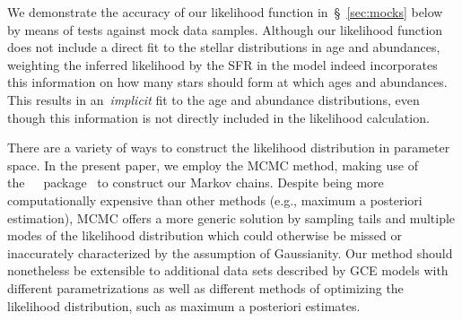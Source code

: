 \documentclass[ms.tex]{subfiles}
\begin{document}
\par
We demonstrate the accuracy of our likelihood function in~\S~\ref{sec:mocks}
below by means of tests against mock data samples.
Although our likelihood function does not include a direct fit to the
stellar distributions in age and abundances, weighting the inferred likelihood
by the SFR in the model indeed incorporates this information on how many stars
should form at which ages and abundances.
This results in an~\textit{implicit} fit to the age and abundance distributions,
even though this information is not directly included in the likelihood
calculation.
\par
There are a variety of ways to construct the likelihood distribution in
parameter space.
In the present paper, we employ the MCMC method, making use of
the~\mc~\python~package~\citep{Foreman-Mackey2013} to construct our Markov
chains.
Despite being more computationally expensive than other methods (e.g.,
maximum a posteriori estimation), MCMC offers a more generic solution by
sampling tails and multiple modes of the likelihood distribution which could
otherwise be missed or inaccurately characterized by the assumption of
Gaussianity.
Our method should nonetheless be extensible to additional data sets described
by GCE models with different parametrizations as well as different methods of
optimizing the likelihood distribution, such as maximum a posteriori estimates.
\end{document}
